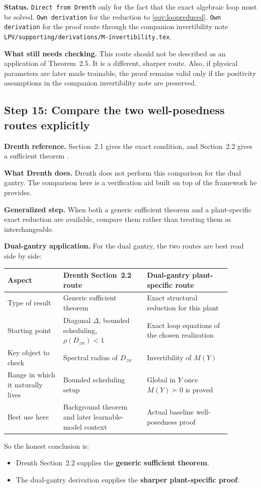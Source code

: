 ﻿\documentclass[11pt]{article}
\newcommand{\audititem}[2]{\par\smallskip\noindent\textbf{#1.} #2\par}
\newcommand{\statusline}[1]{\texttt{#1}}
\begin{document}
\audititem{Status}{\statusline{Direct from Drenth} only for the fact that the
exact algebraic loop must be solved. \statusline{Own derivation} for the
reduction to \eqref{eqv:loopreduced}. \statusline{Own derivation} for the proof
route through the companion invertibility note \texttt{LPV/supporting/derivations/M-invertibility.tex}.}

\audititem{What still needs checking}{This route should not be described as an
application of Theorem~2.5. It is a different, sharper route.
Also, if physical parameters are later made trainable, the proof remains valid
only if the positivity assumptions in the companion invertibility note are
preserved.}

\subsection{Step 15: Compare the two well-posedness routes explicitly}

\audititem{Drenth reference}{Section~2.1 gives the exact condition, and
Section~2.2 gives a sufficient theorem \cite{drenth2025thesis}.}

\audititem{What Drenth does}{Drenth does not perform this comparison for the
dual gantry. The comparison here is a verification aid built on top of the
framework he provides.}

\audititem{Generalized step}{When both a generic sufficient theorem and a
plant-specific exact reduction are available, compare them rather than treating
them as interchangeable.}

\audititem{Dual-gantry application}{For the dual gantry, the two routes are best
read side by side:
\begin{center}
\begin{tabular}{p{0.22\linewidth}p{0.33\linewidth}p{0.33\linewidth}}
\toprule
Aspect & Drenth Section~2.2 route & Dual-gantry plant-specific route \\
\midrule
Type of result & Generic sufficient theorem & Exact structural reduction for this plant \\
Starting point & Diagonal $\Delta$, bounded scheduling, $\rho(D_{zw})<1$ & Exact loop equations of the chosen realization \\
Key object to check & Spectral radius of $D_{zw}$ & Invertibility of $M(Y)$ \\
Range in which it naturally lives & Bounded scheduling setup & Global in $Y$ once $M(Y)\succ 0$ is proved \\
Best use here & Background theorem and later learnable-model context & Actual baseline well-posedness proof \\
\bottomrule
\end{tabular}
\end{center}
So the honest conclusion is:
\begin{itemize}[leftmargin=1.2em]
    \item Drenth Section~2.2 supplies the \textbf{generic sufficient theorem}.
    \item The dual-gantry derivation supplies the \textbf{sharper plant-specific
    proof}.
\end{itemize}}
\end{document}
